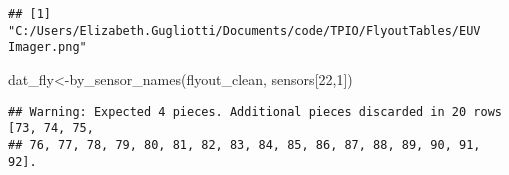 \documentclass[
]{article}
\newenvironment{Shaded}{\begin{snugshade}}{\end{snugshade}}
\newcommand{\DecValTok}[1]{\textcolor[rgb]{0.00,0.00,0.81}{#1}}
\newcommand{\FunctionTok}[1]{\textcolor[rgb]{0.00,0.00,0.00}{#1}}
\newcommand{\NormalTok}[1]{#1}
\newcommand{\OtherTok}[1]{\textcolor[rgb]{0.56,0.35,0.01}{#1}}
\begin{document}
\begin{verbatim}
## [1] "C:/Users/Elizabeth.Gugliotti/Documents/code/TPIO/FlyoutTables/EUV Imager.png"
\end{verbatim}

\begin{Shaded}
\begin{Highlighting}[]
\NormalTok{dat\_fly}\OtherTok{\textless{}{-}}\FunctionTok{by\_sensor\_names}\NormalTok{(flyout\_clean, sensors[}\DecValTok{22}\NormalTok{,}\DecValTok{1}\NormalTok{])}
\end{Highlighting}
\end{Shaded}

\begin{verbatim}
## Warning: Expected 4 pieces. Additional pieces discarded in 20 rows [73, 74, 75,
## 76, 77, 78, 79, 80, 81, 82, 83, 84, 85, 86, 87, 88, 89, 90, 91, 92].
\end{verbatim}
\end{document}
